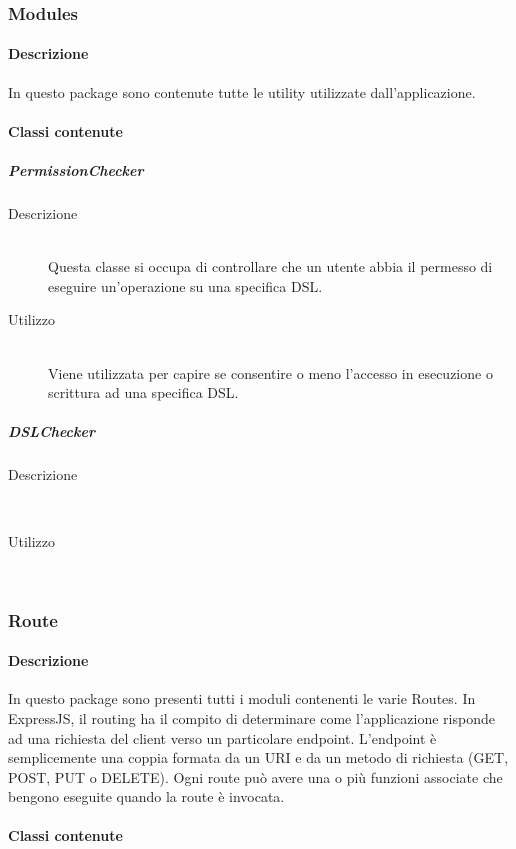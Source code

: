 \subsubsection{Modules}
\paragraph{Descrizione}
In questo package sono contenute tutte le utility utilizzate dall'applicazione.
\paragraph{Classi contenute}
\subparagraph{PermissionChecker}
\begin{description}
\item[Descrizione] \hfill \\
Questa classe si occupa di controllare che un utente abbia il permesso di eseguire un'operazione su una specifica DSL.
\item[Utilizzo] \hfill \\
Viene utilizzata per capire se consentire o meno l'accesso in esecuzione o scrittura ad una specifica DSL.
\end{description}
\subparagraph{DSLChecker}
\begin{description}
\item[Descrizione] \hfill \\
\item[Utilizzo] \hfill \\
\end{description}

\subsubsection{Route}
\paragraph{Descrizione}
In questo package sono presenti tutti i moduli contenenti le varie Routes. In ExpressJS, il routing ha il compito di determinare come l'applicazione risponde ad una richiesta del client verso un particolare endpoint. L'endpoint è semplicemente una coppia formata da un URI e da un metodo di richiesta (GET, POST, PUT o DELETE). Ogni route può avere una o più funzioni associate che bengono eseguite quando la route è invocata.
\paragraph{Classi contenute}

